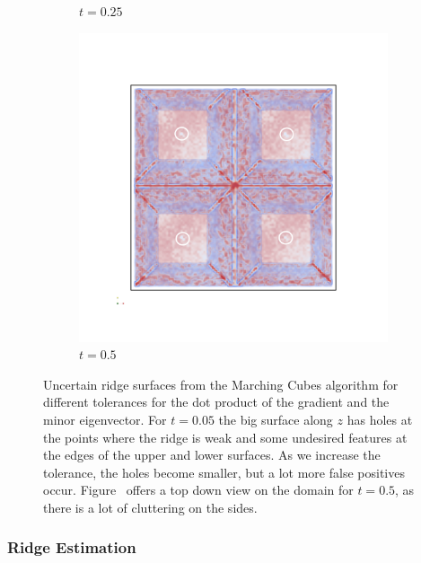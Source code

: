 \begin{figure}[ht]
\begin{subfigure}[]{0.49\textwidth}
        \caption{$t=0.25$}
        \label{fig:MCridgetol}
    \end{subfigure}
    \begin{subfigure}[]{0.49\textwidth}
        \includegraphics[trim=0 300 0 300, clip=true, width=\textwidth]{Images/MCridgetoltop.png}
        \caption{$t=0.5$}
        \label{fig:MCridgetop}
    \end{subfigure}
    \caption{Uncertain ridge surfaces from the Marching Cubes algorithm
    for different tolerances for the dot product of the gradient and the
    minor eigenvector. For $t=0.05$ the big surface along $z$ has holes
    at the points where the ridge is weak and some undesired features at
    the edges of the upper and lower surfaces. As we increase the
    tolerance, the holes become smaller, but a lot more false positives
    occur. Figure~ offers a top down view on the
    domain for $t=0.5$, as there is a lot of cluttering on the sides.}
    \label{fig:MCridges}
\end{figure}

\subsubsection{Ridge Estimation}

